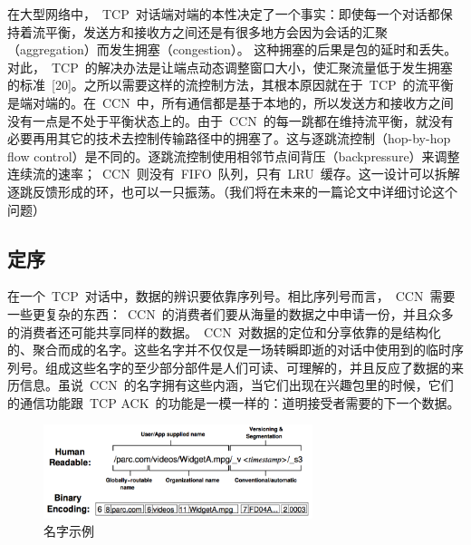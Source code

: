 在大型网络中，~TCP~对话端对端的本性决定了一个事实：即使每一个对话都保持着流平衡，发送方和接收方之间还是有很多地方会因为会话的汇聚（aggregation）而发生拥塞（congestion）。%
这种拥塞的后果是包的延时和丢失。对此，~TCP~的解决办法是让端点动态调整窗口大小，使汇聚流量低于发生拥塞的标准~[20]。之所以需要这样的流控制方法，其根本原因就在于~TCP~的流平衡是端对端的。在~CCN~中，所有通信都是基于本地的，所以发送方和接收方之间没有一点是不处于平衡状态上的。由于~CCN~的每一跳都在维持流平衡，就没有必要再用其它的技术去控制传输路径中的拥塞了。这与逐跳流控制（hop-by-hop flow control）是不同的。逐跳流控制使用相邻节点间背压（backpressure）来调整连续流的速率；~CCN~则没有~FIFO~队列，只有~LRU~缓存。这一设计可以拆解逐跳反馈形成的环，也可以一只振荡。（我们将在未来的一篇论文中详细讨论这个问题）

	
\subsection{定序}
\label{sec:3.2}
在一个~TCP~对话中，数据的辨识要依靠序列号。相比序列号而言，~CCN~需要一些更复杂的东西：~CCN~的消费者们要从海量的数据之中申请一份，并且众多的消费者还可能共享同样的数据。~CCN~对数据的定位和分享依靠的是结构化的、聚合而成的名字。这些名字并不仅仅是一场转瞬即逝的对话中使用到的临时序列号。组成这些名字的至少部分部件是人们可读、可理解的，并且反应了数据的来历信息。虽说~CCN~的名字拥有这些内涵，当它们出现在兴趣包里的时候，它们的通信功能跟~TCP ACK~的功能是一模一样的：道明接受者需要的下一个数据。

\begin{figure}[htbp]
  \centering
  \includegraphics[width=0.7\textwidth]{images/name}
  \caption{名字示例} 
  \label{name}
\end{figure}

